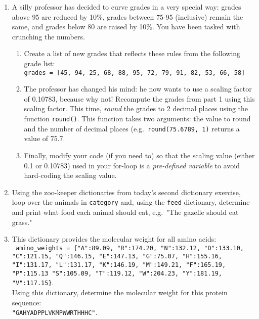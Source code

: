 \documentclass{article}[12pt]
\newcommand{\code}[1]{\texttt{#1}}  %
\begin{document}
\begin{enumerate}[itemsep=5ex]
	
	\item A silly professor has decided to curve grades in a very special way: grades above 95 are reduced by 10\%, grades between 75-95 (inclusive) remain the same, and grades below 80 are raised by 10\%. You have been tasked with crunching the numbers.
	
	\begin{enumerate}[itemsep=2ex]
		\item Create a list of new grades that reflects these rules from the following grade list: \\
		\code{grades = [45, 94, 25, 68, 88, 95, 72, 79, 91, 82, 53, 66, 58]} 
		
		\item The professor has changed his mind: he now wants to use a scaling factor of 0.10783, because why not! Recompute the grades from part 1 using this scaling factor. This time, \emph{round} the grades to 2 decimal places using the function \code{round()}. This function takes two arguments: the value to round and the number of decimal places (e.g.\ \code{round(75.6789, 1)} returns a value of 75.7.
		 
		\item Finally, modify your code (if you need to) so that the scaling value (either 0.1 or 0.10783) used in your for-loop is a \emph{pre-defined variable} to avoid hard-coding the scaling value.
		
	\end{enumerate}
	
	\item Using the zoo-keeper dictionaries from today's second dictionary exercise, loop over the animals in \code{category} and, using the \code{feed} dictionary, determine and print what food each animal should eat, e.g.\ "The gazelle should eat grass." 

	\item This dictionary provides the molecular weight for all amino acids: \\ \code{ amino\_weights = \{"A":89.09, "R":174.20, "N":132.12, "D":133.10, "C":121.15, "Q":146.15, "E":147.13, "G":75.07, "H":155.16, "I":131.17, "L":131.17, "K":146.19, "M":149.21, "F":165.19, "P":115.13 "S":105.09, "T":119.12, "W":204.23, "Y":181.19, "V":117.15\}}. \\ Using this dictionary, determine the molecular weight for this protein sequence: \\ \code{"GAHYADPPLVKMPWWRTHHHC"}.
	

\end{enumerate}
\end{document}
